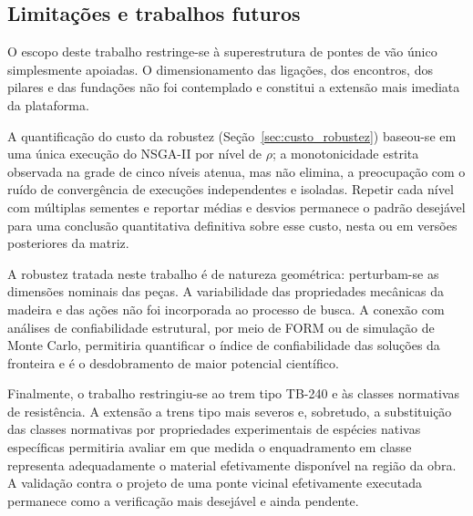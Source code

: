 \subsection*{Limitações e trabalhos futuros}

O escopo deste trabalho restringe-se à superestrutura de pontes de vão único simplesmente apoiadas.
O dimensionamento das ligações, dos encontros, dos pilares e das fundações não foi contemplado e constitui a extensão mais imediata da plataforma.

A quantificação do custo da robustez (Seção~\ref{sec:custo_robustez}) baseou-se em uma única execução do NSGA-II por nível de $\rho$; a monotonicidade estrita observada na grade de cinco níveis atenua, mas não elimina, a preocupação com o ruído de convergência de execuções independentes e isoladas.
Repetir cada nível com múltiplas sementes e reportar médias e desvios permanece o padrão desejável para uma conclusão quantitativa definitiva sobre esse custo, nesta ou em versões posteriores da matriz.

A robustez tratada neste trabalho é de natureza geométrica: perturbam-se as dimensões nominais das peças.
A variabilidade das propriedades mecânicas da madeira e das ações não foi incorporada ao processo de busca.
A conexão com análises de confiabilidade estrutural, por meio de FORM ou de simulação de Monte Carlo, permitiria quantificar o índice de confiabilidade das soluções da fronteira e é o desdobramento de maior potencial científico.

Finalmente, o trabalho restringiu-se ao trem tipo TB-240 e às classes normativas de resistência.
A extensão a trens tipo mais severos e, sobretudo, a substituição das classes normativas por propriedades experimentais de espécies nativas específicas permitiria avaliar em que medida o enquadramento em classe representa adequadamente o material efetivamente disponível na região da obra.
A validação contra o projeto de uma ponte vicinal efetivamente executada permanece como a verificação mais desejável e ainda pendente.
